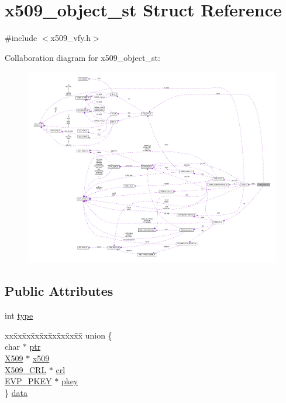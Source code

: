 \hypertarget{structx509__object__st}{}\section{x509\+\_\+object\+\_\+st Struct Reference}
\label{structx509__object__st}


{\ttfamily \#include $<$x509\+\_\+vfy.\+h$>$}



Collaboration diagram for x509\+\_\+object\+\_\+st\+:
\nopagebreak
\begin{figure}[H]
\begin{center}
\leavevmode
\includegraphics[width=350pt]{structx509__object__st__coll__graph}
\end{center}
\end{figure}
\subsection*{Public Attributes}
\begin{DoxyCompactItemize}
\item 
int \hyperlink{structx509__object__st_a9a1693800fb57bf3d3e2f47d2f57ea60}{type}
\item 
\begin{tabbing}
xx\=xx\=xx\=xx\=xx\=xx\=xx\=xx\=xx\=\kill
union \{\\
\>char $\ast$ \hyperlink{structx509__object__st_ae278025994b9d79207dbf47169ea75fa}{ptr}\\
\>\hyperlink{ossl__typ_8h_a4f666bde6518f95deb3050c54b408416}{X509} $\ast$ \hyperlink{structx509__object__st_ac849472db5581793b83d62c188ddd97d}{x509}\\
\>\hyperlink{ossl__typ_8h_ac8661d2485c2c8da5fd7dd26b846f4bf}{X509\_CRL} $\ast$ \hyperlink{structx509__object__st_a6909128bd75b746a0b90aa1127f7b90a}{crl}\\
\>\hyperlink{ossl__typ_8h_a2fca4fef9e4c7a2a739b1ea04acb56ce}{EVP\_PKEY} $\ast$ \hyperlink{structx509__object__st_a904056e374844ca9de82d4a9c3cb9ab6}{pkey}\\
\} \hyperlink{structx509__object__st_a7001a2db752bae0e0fc16be4afb1d46e}{data}\\

\end{tabbing}\end{DoxyCompactItemize}


